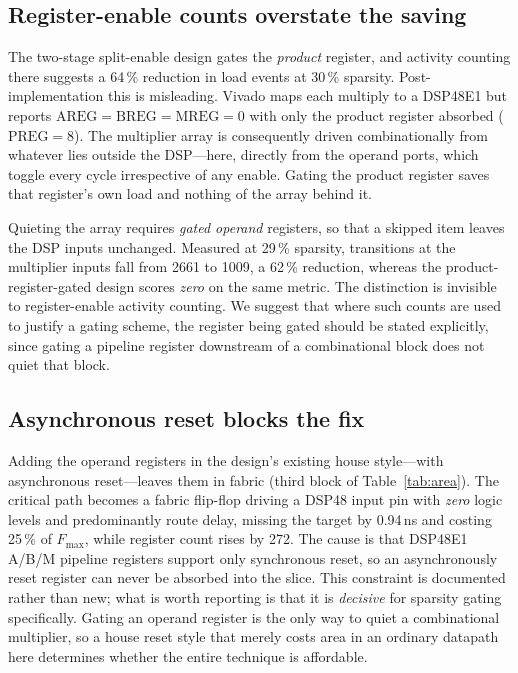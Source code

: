 \documentclass[journal,twocolumn]{IEEEtran}
\begin{document}
\subsection{Register-enable counts overstate the saving}
The two-stage split-enable design gates the \emph{product} register, and
activity counting there suggests a 64\,\% reduction in load events at 30\,\%
sparsity. Post-implementation this is misleading. Vivado maps each multiply to
a DSP48E1 but reports $\mathrm{AREG}=\mathrm{BREG}=\mathrm{MREG}=0$ with only
the product register absorbed ($\mathrm{PREG}=8$). The multiplier array is
consequently driven combinationally from whatever lies outside the DSP---here,
directly from the operand ports, which toggle every cycle irrespective of any
enable. Gating the product register saves that register's own load and
nothing of the array behind it.

Quieting the array requires \emph{gated operand} registers, so that a skipped
item leaves the DSP inputs unchanged. Measured at 29\,\% sparsity, transitions
at the multiplier inputs fall from 2661 to 1009, a 62\,\% reduction, whereas
the product-register-gated design scores \emph{zero} on the same metric. The
distinction is invisible to register-enable activity counting. We suggest that
where such counts are used to justify a gating scheme, the register being
gated should be stated explicitly, since gating a pipeline register downstream
of a combinational block does not quiet that block.

\subsection{Asynchronous reset blocks the fix}
Adding the operand registers in the design's existing house style---with
asynchronous reset---leaves them in fabric (third block of Table~\ref{tab:area}). The critical path becomes
a fabric flip-flop driving a DSP48 input pin with \emph{zero} logic levels and
predominantly route delay, missing the target by 0.94\,ns and costing 25\,\%
of $F_{\max}$, while register count rises by 272. The cause is that DSP48E1
A/B/M pipeline registers support only synchronous reset, so an asynchronously
reset register can never be absorbed into the slice. This constraint is
documented \cite{ug901} rather than new; what is worth reporting is that it is
\emph{decisive} for sparsity gating specifically. Gating an operand register is
the only way to quiet a combinational multiplier, so a house reset style that
merely costs area in an ordinary datapath here determines whether the entire
technique is affordable.
\end{document}
